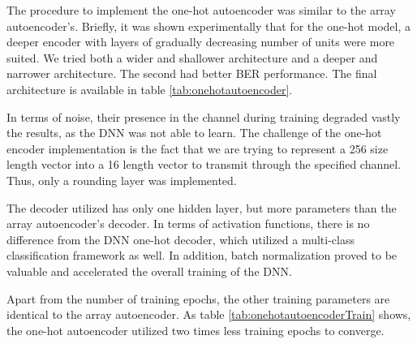 \documentclass[conference]{IEEEtran}
\begin{document}
The procedure to implement the one-hot autoencoder was similar to the array autoencoder's. Briefly, it was shown experimentally that for the one-hot model, a deeper encoder with layers of gradually decreasing number of units were more suited. We tried both a wider and shallower architecture and a deeper and narrower architecture. The second had better BER performance. The final architecture is available in table \ref{tab:onehotautoencoder}.

In terms of noise, their presence in the channel during training degraded vastly the results, as the DNN was not able to learn. The challenge of the one-hot encoder implementation is the fact that we are trying to represent a 256 size length vector into a 16 length vector to transmit through the specified channel. Thus, only a rounding layer was implemented.

The decoder utilized has only one hidden layer, but more parameters than the array autoencoder's decoder. In terms of activation functions, there is no difference from the DNN one-hot decoder, which utilized a multi-class classification framework as well. In addition, batch normalization proved to be valuable and accelerated the overall training of the DNN.

Apart from the number of training epochs, the other training parameters are identical to the array autoencoder. As table \ref{tab:onehotautoencoderTrain} shows, the one-hot autoencoder utilized two times less training epochs to converge.
\end{document}
